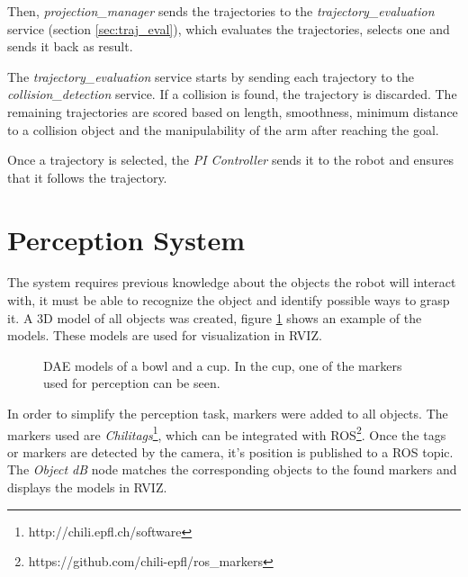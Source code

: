 Then, \textit{projection\_manager} sends the trajectories to the \textit{trajectory\_evaluation} service (section \ref{sec:traj_eval}), which evaluates the trajectories, selects one and sends it back as result. 

The \textit{trajectory\_evaluation} service starts by sending each trajectory to the \textit{collision\_detection} service. If a collision is found, the trajectory is discarded. The remaining trajectories are scored based on length, smoothness, minimum distance to a collision object and the manipulability of the arm after reaching the goal. 

Once a trajectory is selected, the \textit{PI Controller} sends it to the robot and ensures that it follows the trajectory.

\section{Perception System}
\label{sec:perception}

The system requires previous knowledge about the objects the robot will interact with, it must be able to recognize the object and identify possible ways to grasp it. A 3D model of all objects was created, figure \ref{fig:model} shows an example of the models. These models are used for visualization in RVIZ. 
\begin{figure}[H]
	\centering
	\begin{subfigure}
		{\texttt{[image: bowl3.png]}}
	\end{subfigure}
	\hspace{15pt}
	\begin{subfigure}
		{\texttt{[image: cup3.png]}}
	\end{subfigure}
	\vspace{-12pt}
	\caption[3D models]{DAE models of a bowl and a cup. In the cup, one of the markers used for perception can be seen.}
	\vspace{-10pt}
	\label{fig:model}
\end{figure}

In order to simplify the perception task, markers were added to all objects. The markers used are \textit{Chilitags}\footnote{http://chili.epfl.ch/software}, which can be integrated with ROS\footnote{https://github.com/chili-epfl/ros\_markers}. Once the tags or markers are detected by the camera, it's position is published to a ROS topic. The \textit{Object dB} node matches the corresponding objects to the found markers and displays the models in RVIZ.

